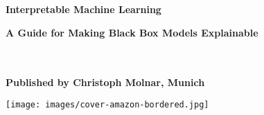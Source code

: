 \thispagestyle{empty}




\thispagestyle{empty}

\vspace{3cm}
  \begin{center}
	\bfseries \sffamily \Huge Interpretable Machine Learning\par
	\bfseries \LARGE A Guide for Making Black Box Models Explainable\par
~\\
	~\\
	\bfseries \small Published by Christoph Molnar, Munich\par
    	\texttt{[image: images/cover-amazon-bordered.jpg]}
  \end{center}


\newpage





